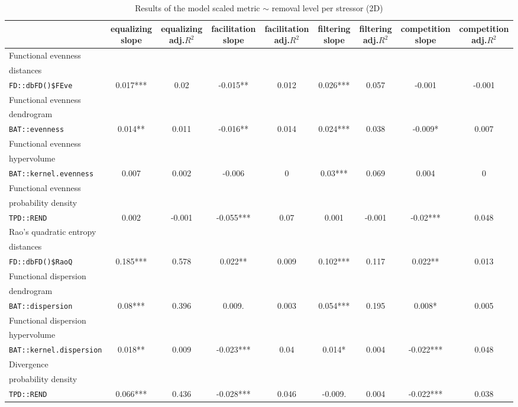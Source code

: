 \documentclass[12pt,letterpaper]{article}
\begin{document}
\begin{landscape}
\begin{table}
\scriptsize
\caption{Results of the model scaled metric $\sim$ removal level per stressor (2D)}
\centering
\begin{tabular}[t]{l|c|c|c|c|c|c|c|c}
\hline
  & equalizing slope & equalizing adj.$R^{2}$ & facilitation slope & facilitation adj.$R^{2}$ & filtering slope & filtering adj.$R^{2}$ & competition slope & competition adj.$R^{2}$\\
\hline
Functional evenness\\distances\\ \texttt{FD::dbFD()\$FEve} & 0.017*** & 0.02 & -0.015** & 0.012 & 0.026*** & 0.057 & -0.001 & -0.001\\
\hline
Functional evenness\\dendrogram\\ \texttt{BAT::evenness} & 0.014** & 0.011 & -0.016** & 0.014 & 0.024*** & 0.038 & -0.009* & 0.007\\
\hline
Functional evenness\\hypervolume\\ \texttt{BAT::kernel.evenness} & 0.007 & 0.002 & -0.006 & 0 & 0.03*** & 0.069 & 0.004 & 0\\
\hline
Functional evenness\\probability density\\ \texttt{TPD::REND} & 0.002 & -0.001 & -0.055*** & 0.07 & 0.001 & -0.001 & -0.02*** & 0.048\\
\hline
Rao's quadratic entropy\\distances\\ \texttt{FD::dbFD()\$RaoQ} & 0.185*** & 0.578 & 0.022** & 0.009 & 0.102*** & 0.117 & 0.022** & 0.013\\
\hline
Functional dispersion\\dendrogram\\ \texttt{BAT::dispersion} & 0.08*** & 0.396 & 0.009. & 0.003 & 0.054*** & 0.195 & 0.008* & 0.005\\
\hline
Functional dispersion\\hypervolume\\ \texttt{BAT::kernel.dispersion} & 0.018** & 0.009 & -0.023*** & 0.04 & 0.014* & 0.004 & -0.022*** & 0.048\\
\hline
Divergence\\probability density\\ \texttt{TPD::REND} & 0.066*** & 0.436 & -0.028*** & 0.046 & -0.009. & 0.004 & -0.022*** & 0.038\\

\end{tabular}
\end{table}
\end{landscape}
\end{document}

